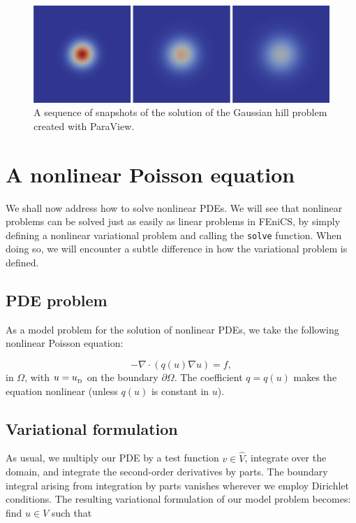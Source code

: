 \documentclass[graybox,envcountchap,sectrefs,final]{svmonodo}
\begin{document}
\begin{figure}[!ht]  %
  \centerline{\includegraphics[width=0.95\linewidth]{fig/heat.png}}
  \caption{
  A sequence of snapshots of the solution of the Gaussian hill problem created with ParaView. \label{fig:snapshots}
  }
\end{figure}


\section{A nonlinear Poisson equation}
\label{ftut1:gallery:nonlinearpoisson}


We shall now address how to solve nonlinear PDEs. We will see that
nonlinear problems can be solved just as easily as linear problems in
FEniCS, by simply defining a nonlinear variational problem and calling
the \texttt{solve} function. When doing so, we will encounter a subtle
difference in how the variational problem is defined.

\subsection{PDE problem}

As a model problem for the solution of nonlinear PDEs, we
take the following nonlinear Poisson equation:

\begin{equation}
-\nabla\cdot\left(q(u)\nabla u\right) = f,
\end{equation}
in $\Omega$, with $u=\ub$ on the boundary $\partial\Omega$.
The coefficient $q = q(u)$ makes the equation nonlinear (unless $q(u)$
is constant in $u$).

\subsection{Variational formulation}

As usual, we multiply our PDE by a test function $v\in\hat V$,
integrate over the domain, and integrate the second-order derivatives
by parts. The boundary integral arising from integration by parts
vanishes wherever we employ Dirichlet conditions. The resulting
variational formulation of our model problem becomes: find $u \in V$
such that
\end{document}
